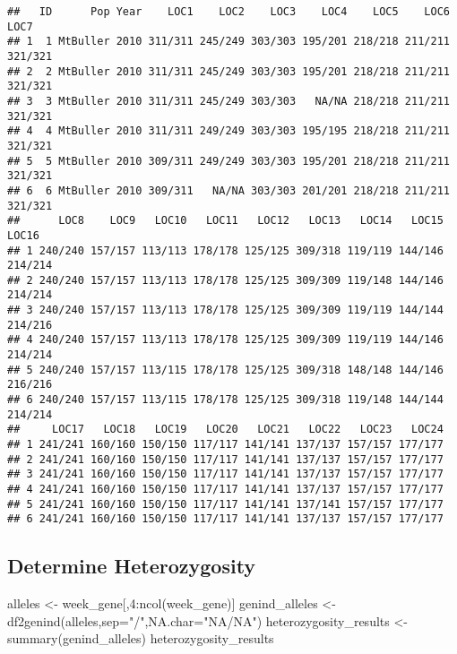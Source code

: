 \documentclass[
]{article}
\newenvironment{Shaded}{\begin{snugshade}}{\end{snugshade}}
\newcommand{\AttributeTok}[1]{\textcolor[rgb]{0.77,0.63,0.00}{#1}}
\newcommand{\DecValTok}[1]{\textcolor[rgb]{0.00,0.00,0.81}{#1}}
\newcommand{\FunctionTok}[1]{\textcolor[rgb]{0.00,0.00,0.00}{#1}}
\newcommand{\NormalTok}[1]{#1}
\newcommand{\OtherTok}[1]{\textcolor[rgb]{0.56,0.35,0.01}{#1}}
\newcommand{\SpecialCharTok}[1]{\textcolor[rgb]{0.00,0.00,0.00}{#1}}
\newcommand{\StringTok}[1]{\textcolor[rgb]{0.31,0.60,0.02}{#1}}
\begin{document}
\begin{verbatim}
##   ID      Pop Year    LOC1    LOC2    LOC3    LOC4    LOC5    LOC6    LOC7
## 1  1 MtBuller 2010 311/311 245/249 303/303 195/201 218/218 211/211 321/321
## 2  2 MtBuller 2010 311/311 245/249 303/303 195/201 218/218 211/211 321/321
## 3  3 MtBuller 2010 311/311 245/249 303/303   NA/NA 218/218 211/211 321/321
## 4  4 MtBuller 2010 311/311 249/249 303/303 195/195 218/218 211/211 321/321
## 5  5 MtBuller 2010 309/311 249/249 303/303 195/201 218/218 211/211 321/321
## 6  6 MtBuller 2010 309/311   NA/NA 303/303 201/201 218/218 211/211 321/321
##      LOC8    LOC9   LOC10   LOC11   LOC12   LOC13   LOC14   LOC15   LOC16
## 1 240/240 157/157 113/113 178/178 125/125 309/318 119/119 144/146 214/214
## 2 240/240 157/157 113/113 178/178 125/125 309/309 119/148 144/146 214/214
## 3 240/240 157/157 113/113 178/178 125/125 309/309 119/119 144/144 214/216
## 4 240/240 157/157 113/113 178/178 125/125 309/309 119/119 144/146 214/214
## 5 240/240 157/157 113/115 178/178 125/125 309/318 148/148 144/146 216/216
## 6 240/240 157/157 113/115 178/178 125/125 309/318 119/148 144/144 214/214
##     LOC17   LOC18   LOC19   LOC20   LOC21   LOC22   LOC23   LOC24
## 1 241/241 160/160 150/150 117/117 141/141 137/137 157/157 177/177
## 2 241/241 160/160 150/150 117/117 141/141 137/137 157/157 177/177
## 3 241/241 160/160 150/150 117/117 141/141 137/137 157/157 177/177
## 4 241/241 160/160 150/150 117/117 141/141 137/137 157/157 177/177
## 5 241/241 160/160 150/150 117/117 141/141 137/141 157/157 177/177
## 6 241/241 160/160 150/150 117/117 141/141 137/137 157/157 177/177
\end{verbatim}

\hypertarget{determine-heterozygosity}{%
\subsection{Determine Heterozygosity}\label{determine-heterozygosity}}

\begin{Shaded}
\begin{Highlighting}[]
\NormalTok{alleles }\OtherTok{\textless{}{-}}\NormalTok{ week\_gene[,}\DecValTok{4}\SpecialCharTok{:}\FunctionTok{ncol}\NormalTok{(week\_gene)]}
\NormalTok{genind\_alleles }\OtherTok{\textless{}{-}} \FunctionTok{df2genind}\NormalTok{(alleles,}\AttributeTok{sep=}\StringTok{"/"}\NormalTok{,}\AttributeTok{NA.char=}\StringTok{"NA/NA"}\NormalTok{)}
\NormalTok{heterozygosity\_results }\OtherTok{\textless{}{-}} \FunctionTok{summary}\NormalTok{(genind\_alleles)}
\NormalTok{heterozygosity\_results}
\end{Highlighting}
\end{Shaded}
\end{document}
